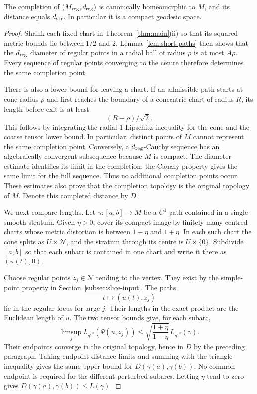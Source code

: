 \begin{proposition}\label{prop:completion}
The completion of $(M_{\mathrm{reg}},d_{\mathrm{reg}})$ is canonically
homeomorphic to $M$, and its distance equals $d_{\mathrm{str}}$.
In particular it is a compact geodesic space.
\end{proposition}

\begin{proof}
Shrink each fixed chart in Theorem~\ref{thm:main}(ii) so
that its squared metric bounds lie between $1/2$ and $2$.
Lemma~\ref{lem:short-paths} then shows that the $d_{\mathrm{reg}}$
diameter of regular points in a radial ball of radius
$\rho$ is at most $A\rho$. Every sequence of regular
points converging to the centre therefore determines the
same completion point.

There is also a lower bound for leaving a chart. If an
admissible path starts at cone radius $\rho$ and first
reaches the boundary of a concentric chart of radius $R$,
its length before exit is at least
\begin{equation}\label{eq:exit}
 (R-\rho)/\sqrt2.
\end{equation}
This follows by integrating the radial $1$-Lipschitz
inequality for the cone and the coarse tensor lower bound.
In particular, distinct points of $M$ cannot represent
the same completion point. Conversely, a $d_{\mathrm{reg}}$-Cauchy
sequence has an algebraically convergent subsequence because
$M$ is compact. The diameter estimate identifies its limit
in the completion; the Cauchy property gives the same limit
for the full sequence. Thus no additional completion points
occur. These estimates also prove that the completion
topology is the original topology of $M$. Denote this
completed distance by $D$.

We next compare lengths. Let $\gamma:[a,b]\to M$ be a
$C^1$ path contained in a single smooth stratum. Given
$\eta>0$, cover its compact image by finitely many centred
charts whose metric distortion is between $1-\eta$ and
$1+\eta$. In each such chart the cone splits as
$U\times\mathcal N$, and the stratum through its centre
is $U\times\{0\}$. Subdivide $[a,b]$ so that each
subarc is contained in one chart and write it there as
$(u(t),0)$.

Choose regular points $z_j\in\mathcal N$ tending to
the vertex. They exist by the simple-point property in
Section~\ref{subsec:slice-input}. The paths
\begin{equation}\label{eq:transverse-path}
 t\longmapsto (u(t),z_j)
\end{equation}
lie in the regular locus for large $j$. Their lengths in
the exact product are the Euclidean length of $u$.
The two tensor bounds give, for each subarc,
\[
 \limsup_j L_{g^{L^2}}(\Psi(u,z_j))
 \le \sqrt{\frac{1+\eta}{1-\eta}}\,L_{g^{L^2}}(\gamma).
\]
Their endpoints converge in the original topology, hence
in $D$ by the preceding paragraph. Taking endpoint
distance limits and summing with the triangle inequality
gives the same upper bound for $D(\gamma(a),\gamma(b))$.
No common endpoint is required for the different
perturbed subarcs. Letting $\eta$ tend to zero gives
$D(\gamma(a),\gamma(b))\le L(\gamma)$.


\end{proof}
